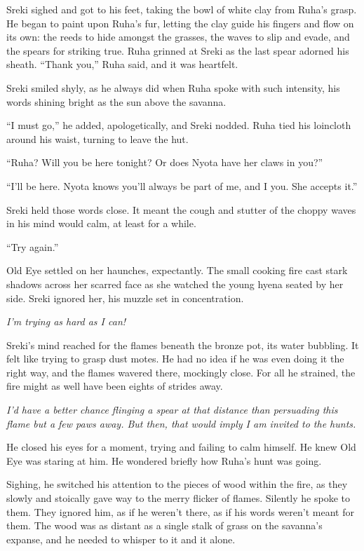 Sreki sighed and got to his feet, taking the bowl of white clay from Ruha's grasp. He began to paint upon Ruha's fur, letting the clay guide his fingers and flow on its own: the reeds to hide amongst the grasses, the waves to slip and evade, and the spears for striking true. Ruha grinned at Sreki as the last spear adorned his sheath. ``Thank you,'' Ruha said, and it was heartfelt.

Sreki smiled shyly, as he always did when Ruha spoke with such intensity, his words shining bright as the sun above the savanna.

``I must go,'' he added, apologetically, and Sreki nodded. Ruha tied his loincloth around his waist, turning to leave the hut.

``Ruha? Will you be here tonight? Or does Nyota have her claws in you?''

``I'll be here. Nyota knows you'll always be part of me, and I you. She accepts it.''

Sreki held those words close. It meant the cough and stutter of the choppy waves in his mind would calm, at least for a while.

\secdiv

``Try again.''

Old Eye settled on her haunches, expectantly. The small cooking fire cast stark shadows across her scarred face as she watched the young hyena seated by her side. Sreki ignored her, his muzzle set in concentration.

\emph{I'm trying as hard as I can!}

Sreki's mind reached for the flames beneath the bronze pot, its water bubbling. It felt like trying to grasp dust motes. He had no idea if he was even doing it the right way, and the flames wavered there, mockingly close. For all he strained, the fire might as well have been eights of strides away.

\emph{I'd have a better chance flinging a spear at that distance than persuading this flame but a few paws away. But then, that would imply I am invited to the hunts.}

He closed his eyes for a moment, trying and failing to calm himself. He knew Old Eye was staring at him. He wondered briefly how Ruha's hunt was going.

Sighing, he switched his attention to the pieces of wood within the fire, as they slowly and stoically gave way to the merry flicker of flames. Silently he spoke to them. They ignored him, as if he weren't there, as if his words weren't meant for them. The wood was as distant as a single stalk of grass on the savanna's expanse, and he needed to whisper to it and it alone.

